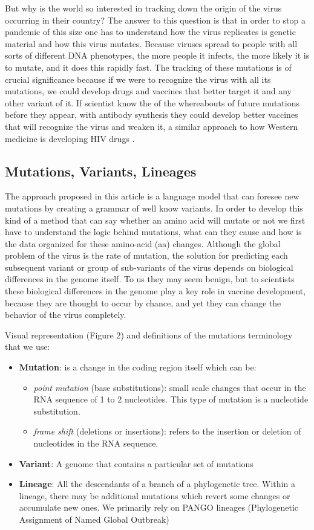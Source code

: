 \documentclass[conference,compsoc]{IEEEtran}
\begin{document}
But why is the world so interested in tracking down the origin of the virus occurring in their country? 
The answer to this question is that in order to stop a pandemic of this size one has to understand how the virus replicates is genetic material and how this virus mutates. Because viruses spread to people with all sorts of different DNA phenotypes, the more people it infects, the more likely it is to mutate, and it does this rapidly fast. The tracking of these mutations is of crucial significance because if we were to recognize the virus with all its mutations, we could develop drugs and vaccines that better target it and any other variant of it. If scientist know the of the whereabouts of future mutations before they appear, with antibody synthesis they could develop better vaccines that will recognize the virus and weaken it, a similar approach to how Western medicine is developing HIV drugs \cite{ref10}.

\subsection{Mutations, Variants, Lineages}

The approach proposed in this article is a language model that can foresee new mutations by creating a grammar of well know variants. In order to develop this kind of a method that can say whether an amino acid will mutate or not we first have to understand the logic behind mutations, what can they cause and how is the data organized for these amino-acid (aa) changes. Although the global problem of the virus is the rate of mutation, the solution for predicting each subsequent variant or group of sub-variants of the virus depends on biological differences in the genome itself. To us they may seem benign, but to scientists these biological differences in the genome play a key role in vaccine development, because they are thought to occur by chance, and yet they can change the behavior of the virus completely. 

Visual representation (Figure 2) and definitions of the mutations terminology that we use:
\begin{itemize}
\item \textbf{Mutation}: is a change in the coding region itself which can be:
\begin{itemize}
 \item \textit{point mutation} (base substitutions): small scale changes that occur in the RNA sequence of 1 to 2 nucleotides. This type of mutation is a nucleotide substitution.
 \item \textit{frame shift} (deletions or insertions): refers to the insertion or deletion of nucleotides in the RNA sequence.
\end{itemize}
\item \textbf{Variant}: A genome that contains a particular set of mutations
\item \textbf{Lineage}: All the descendants of a branch of a phylogenetic tree. Within a lineage, there may be additional mutations which revert some changes or accumulate new ones. We primarily rely on PANGO lineages \cite{ref15} (Phylogenetic Assignment of Named Global Outbreak)
\end{itemize}
\end{document}
